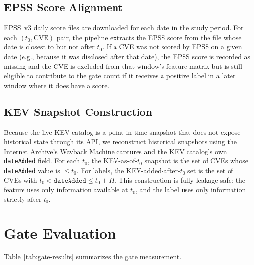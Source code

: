 \documentclass[conference]{IEEEtran}
\begin{document}
\subsection{EPSS Score Alignment}

EPSS~v3 daily score files are downloaded for each date in the study period.
For each $(t_0, \text{CVE})$ pair, the pipeline extracts the EPSS score from
the file whose date is closest to but not after $t_0$. If a CVE was not
scored by EPSS on a given date (e.g., because it was disclosed after that
date), the EPSS score is recorded as missing and the CVE is excluded from
that window's feature matrix but is still eligible to contribute to the gate
count if it receives a positive label in a later window where it does have a
score.

\subsection{KEV Snapshot Construction}

Because the live KEV catalog is a point-in-time snapshot that does not
expose historical state through its API, we reconstruct historical snapshots
using the Internet Archive's Wayback Machine captures and the KEV catalog's
own \texttt{dateAdded} field. For each $t_0$, the KEV-as-of-$t_0$ snapshot
is the set of CVEs whose \texttt{dateAdded} value is $\leq t_0$. For labels,
the KEV-added-after-$t_0$ set is the set of CVEs with $t_0 < \texttt{dateAdded}
\leq t_0 + H$. This construction is fully leakage-safe: the feature uses only
information available at $t_0$, and the label uses only information strictly
after $t_0$.

\section{Gate Evaluation}
\label{sec:gate-eval}

Table~\ref{tab:gate-results} summarizes the gate measurement.
\end{document}
